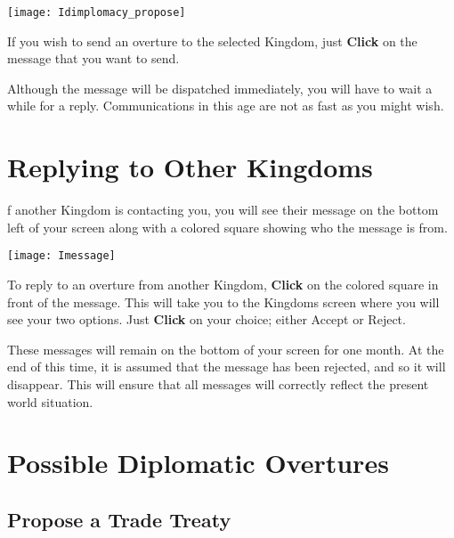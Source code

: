 \begin{center}
    \texttt{[image: Idimplomacy\_propose]} %
\end{center}

If you wish to send an overture to the selected Kingdom, just \textbf{Click} on the message that you want to send.

Although the message will be dispatched immediately, you will have to wait a while for a reply. Communications in this age are not as fast as you might wish.

\section{Replying to Other Kingdoms}


f another Kingdom is contacting you, you will see their message on the bottom left of your screen along with a colored square showing who the message is from.

\begin{center}
    \texttt{[image: Imessage]} %
\end{center}


To reply to an overture from another Kingdom, \textbf{Click} on the colored square in front of the message. This will take you to the Kingdoms screen where you will see your two options. Just \textbf{Click} on your choice; either Accept or Reject.

These messages will remain on the bottom of your screen for one month. At the end of this time, it is assumed that the message has been rejected, and so it will disappear. This will ensure that all messages will correctly reflect the present world situation.

\section{Possible Diplomatic Overtures}


\subsection{Propose a Trade Treaty}


